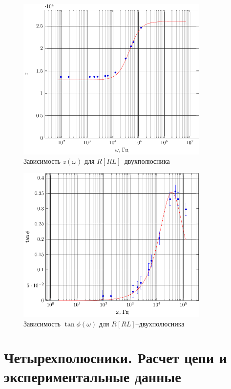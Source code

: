 
\begin{figure}[H]
	\centering
	\includegraphics[width=0.85\textwidth]{img/chem4_z}
	\caption{Зависимость $z(\omega)$ для  $R[RL]$--двухполюсника}
	\label{fig:RRL_z}
\end{figure}
\begin{figure}[H]
	\centering
	\includegraphics[width=0.85\textwidth]{img/chem4_phi} 
	\caption{Зависимость $\tan\phi(\omega)$ для $R[RL]$--двухполюсника}
	\label{fig:RRL_tanphi}
\end{figure}


\section{Четырехполюсники. Расчет цепи и экспериментальные данные}

